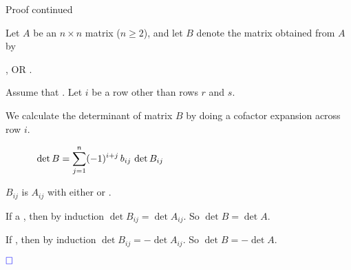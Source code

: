 \documentclass[xcolor=dvipsnames,aspectratio=169,t]{beamer}
\begin{document}
\begin{frame}{Proof continued}
  \smallskip

  {\large {}}

    Let $A$ be an $n \times n$ matrix ($n\ge 2$), and let $B$ denote the matrix obtained from $A$ by
    \vspace*{-.7em}
    \begin{center}
      , OR .
    \end{center}
    
    Assume that . Let $i$ be a row \alert{other than} rows $r$ and $s$.
    
    We calculate the determinant of matrix $B$ by doing a cofactor expansion across row $i$.
    
    \begin{align*}
      \det B &= \sum_{j=1}^n (-1)^{i+j} \, b_{ij} \, \det B_{ij}
      \hspace*{15em} \ 
    \end{align*}
    
    \pause
    $B_{ij}$ is $A_{ij}$ with either  or .
    \medskip
    
    \qquad If a , then by induction $\det B_{ij} = \det A_{ij}$.  So $\det B=\det A$.
    \medskip
    
    \pause
    \qquad If , then by induction $\det B_{ij}=-\det A_{ij}$.  So $\det B=-\det A$.
    
    \hfill $\textcolor{blue}{\Box}$
\end{frame}
\end{document}

